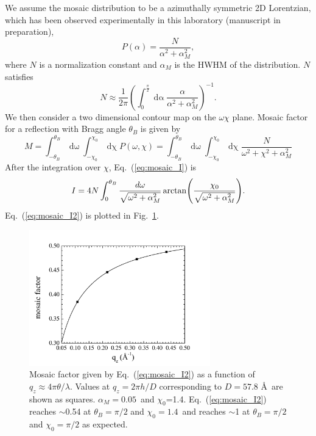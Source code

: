 We assume the mosaic distribution to be a azimuthally symmetric
2D Lorentzian, which has been observed 
experimentally in this laboratory (manuscript in preparation),
\begin{equation}
  P(\alpha) = \frac{N}{\alpha^2+\alpha_M^2},
\end{equation}
where $N$ is a normalization constant and $\alpha_M$ is the HWHM of the 
distribution. $N$ satisfies
\begin{equation}
  N \approx \frac{1}{2\pi}\left(\int_0^{\frac{\pi}{2}}\mathop{d\alpha}
  \frac{\alpha}{\alpha^2+\alpha_M^2}\right)^{-1}.
  \label{eq:mosaic_N}
\end{equation}
We then consider a two dimensional contour map on the $\omega\chi$ plane.
Mosaic factor for a reflection with Bragg angle $\theta_B$ is
given by
\begin{equation}
  M = \int_{-\theta_B}^{\theta_B}\mathop{d\omega} 
  \int_{-\chi_0}^{\chi_0}\mathop{d\chi} P(\omega,\chi)
  = \int_{-\theta_B}^{\theta_B}\mathop{d\omega}
  \int_{-\chi_0}^{\chi_0}\mathop{d\chi}
  \frac{N}{\omega^2+\chi^2+\alpha_M^2}
  \label{eq:mosaic_I}
\end{equation}
After the integration over $\chi$, Eq.~(\ref{eq:mosaic_I}) is
\begin{equation}
  I = 4N\int_0^{\theta_B}\frac{d\omega}{\sqrt{\omega^2+\alpha_M^2}}
  \arctan\mathopen{}\left( \frac{\chi_0}{\sqrt{\omega^2+\alpha_M^2}} \right)\mathclose{}.
  \label{eq:mosaic_I2}
\end{equation}
Eq.~(\ref{eq:mosaic_I2}) is plotted in Fig.~\ref{fig:mosaic_correction}.

\begin{figure}
  \centering
  \includegraphics[width=0.7\textwidth]{figures/ripple/analysis/mosaic_correction}
  \caption[Mosaic factor given by Eq.~(\ref{eq:mosaic_I2}) as a function of 
  $q_z\approx 4\pi\theta/\lambda$]{Mosaic factor given by 
  Eq.~(\ref{eq:mosaic_I2}) as a function of 
  $q_z\approx 4\pi\theta/\lambda$. Values at $q_z=2\pi h/D$ corresponding 
  to $D=57.8$ \AA\ are shown as squares. $\alpha_M=0.05$\textdegree\ and 
  $\chi_0$=1.4\textdegree. Eq.~(\ref{eq:mosaic_I2}) reaches $\sim$0.54 at 
  $\theta_B=\pi/2$ and $\chi_0=1.4$\textdegree\ and reaches $\sim$1 at
  $\theta_B=\pi/2$ and $\chi_0=\pi/2$ as expected.}
  \label{fig:mosaic_correction}
\end{figure}

